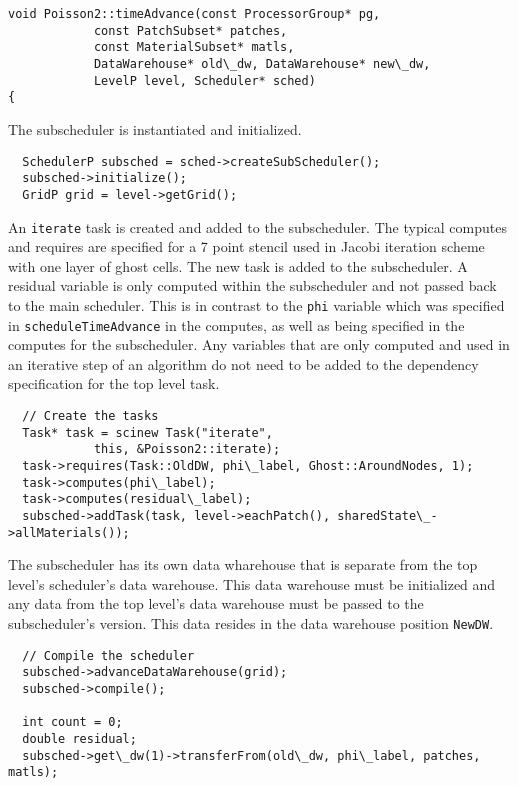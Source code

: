 \documentclass[12pt]{report}
\begin{document}
\begin{verbatim}
void Poisson2::timeAdvance(const ProcessorGroup* pg,
			const PatchSubset* patches,
			const MaterialSubset* matls,
			DataWarehouse* old\_dw, DataWarehouse* new\_dw,
			LevelP level, Scheduler* sched)
{

\end{verbatim}

The subscheduler is instantiated and initialized. 

\begin{verbatim}
  SchedulerP subsched = sched->createSubScheduler();
  subsched->initialize();
  GridP grid = level->getGrid();
\end{verbatim}

An \texttt{iterate} task is created and added to the subscheduler.
The typical computes and requires are specified for a 7 point stencil
used in Jacobi iteration scheme with one layer of ghost cells.  The
new task is added to the subscheduler.  A residual variable is only
computed within the subscheduler and not passed back to the main
scheduler.  This is in contrast to the \texttt{phi} variable which was
specified in \texttt{scheduleTimeAdvance} in the computes, as well as
being specified in the computes for the subscheduler.  Any variables
that are only computed and used in an iterative step of an algorithm
do not need to be added to the dependency specification for the top
level task.

\begin{verbatim}
  // Create the tasks
  Task* task = scinew Task("iterate",
			this, &Poisson2::iterate);
  task->requires(Task::OldDW, phi\_label, Ghost::AroundNodes, 1);
  task->computes(phi\_label);
  task->computes(residual\_label);
  subsched->addTask(task, level->eachPatch(), sharedState\_->allMaterials());
\end{verbatim}

The subscheduler has its own data wharehouse that is separate from the
top level's scheduler's data warehouse.  This data warehouse must be
initialized and any data from the top level's data warehouse must be
passed to the subscheduler's version.  This data resides in the data
warehouse position \texttt{NewDW}.

\begin{verbatim}
  // Compile the scheduler
  subsched->advanceDataWarehouse(grid);
  subsched->compile();

  int count = 0;
  double residual;
  subsched->get\_dw(1)->transferFrom(old\_dw, phi\_label, patches, matls);
\end{verbatim}
\end{document}
